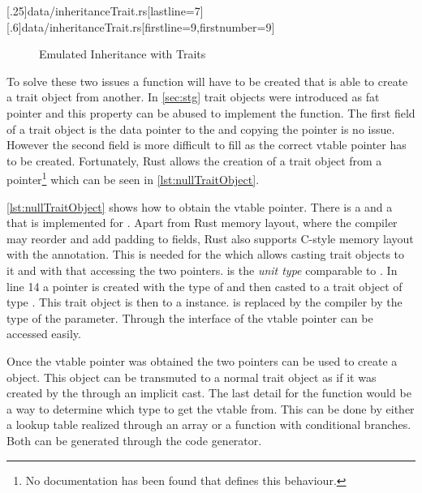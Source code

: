 \documentclass[thesis]{subfiles}
\begin{document}
    \LstTikzBox{\inheritanceTraitOne}[.25\linewidth]{data/inheritanceTrait.rs}[lastline=7]
    \LstTikzBox{\inheritanceTraitTwo}[.6\linewidth]{data/inheritanceTrait.rs}[firstline=9,firstnumber=9]
    \begin{figure}[ht]
      \captionsetup{type=lstlisting}
      \usebox{\inheritanceTraitOne}\hfill%
      \usebox{\inheritanceTraitTwo}
      \caption{Emulated Inheritance with Traits}\label{lst:inheritanceTrait}
    \end{figure}

    To solve these two issues a \cast function will have to be created that is able to create a trait object from another.
    In \autoref{sec:stg} trait objects were introduced as fat pointer and this property can be abused to implement the \cast function.
    The first field of a trait object is the data pointer to the \struct and copying the pointer is no issue.
    However the second field is more difficult to fill as the correct vtable pointer has to be created.
    Fortunately, Rust allows the creation of a trait object from a  pointer\footnote{
      No documentation has been found that defines this behaviour.
    } which can be seen in \autoref{lst:nullTraitObject}.
    \autocite{rust-digg}


    \autoref{lst:nullTraitObject} shows how to obtain the vtable pointer.
    There is a  and a  that is implemented for .
    Apart from Rust memory layout, where the compiler may reorder and add padding to fields, Rust also supports C-style memory layout with the \codr{#[repr(C)]} annotation.
    This is needed for the \TraitObject \struct which allows casting trait objects to it and with that accessing the two pointers.
    \codr{()} is the \emph{unit type} comparable to \autocites[repr(C)]{rust-nom}[Defining and Instantiating Structs]{rust-book}.
    In line 14 a  pointer is created with the type of  and then casted to a trait object of type .
    This trait object is then  to a \TraitObject instance.
    \codr{_} is replaced by the compiler by the type of the parameter.
    Through the interface of \TraitObject the vtable pointer can be accessed easily.

    Once the vtable pointer was obtained the two pointers can be used to create a \TraitObject object.
    This object can be transmuted to a normal trait object as if it was created by the \struct through an implicit cast.
    The last detail for the \cast function would be a way to determine which type to get the vtable from.
    This can be done by either a lookup table realized through an array or a function with conditional branches.
    Both can be generated through the code generator.
\end{document}
